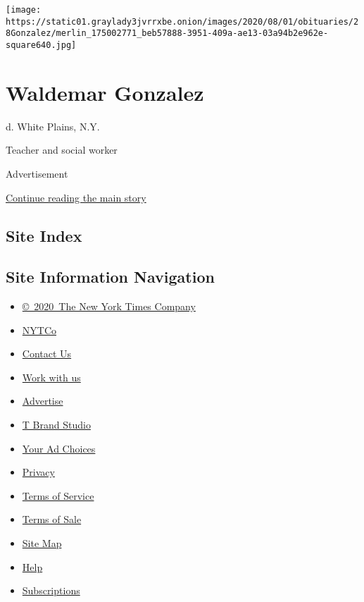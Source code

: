 \texttt{[image: https://static01.graylady3jvrrxbe.onion/images/2020/08/01/obituaries/28Gonzalez/merlin\_175002771\_beb57888-3951-409a-ae13-03a94b2e962e-square640.jpg]}

\hypertarget{waldemar-gonzalez}{%
\section{Waldemar Gonzalez}\label{waldemar-gonzalez}}

d. White Plains, N.Y.

Teacher and social worker

Advertisement

\protect\hyperlink{after-bottom}{Continue reading the main story}

\hypertarget{site-index}{%
\subsection{Site Index}\label{site-index}}

\hypertarget{site-information-navigation}{%
\subsection{Site Information
Navigation}\label{site-information-navigation}}

\begin{itemize}
\tightlist
\item
  \href{https://help.nytimes3xbfgragh.onion/hc/en-us/articles/115014792127-Copyright-notice}{©~2020~The
  New York Times Company}
\end{itemize}

\begin{itemize}
\tightlist
\item
  \href{https://www.nytco.com/}{NYTCo}
\item
  \href{https://help.nytimes3xbfgragh.onion/hc/en-us/articles/115015385887-Contact-Us}{Contact
  Us}
\item
  \href{https://www.nytco.com/careers/}{Work with us}
\item
  \href{https://nytmediakit.com/}{Advertise}
\item
  \href{http://www.tbrandstudio.com/}{T Brand Studio}
\item
  \href{https://www.nytimes3xbfgragh.onion/privacy/cookie-policy\#how-do-i-manage-trackers}{Your
  Ad Choices}
\item
  \href{https://www.nytimes3xbfgragh.onion/privacy}{Privacy}
\item
  \href{https://help.nytimes3xbfgragh.onion/hc/en-us/articles/115014893428-Terms-of-service}{Terms
  of Service}
\item
  \href{https://help.nytimes3xbfgragh.onion/hc/en-us/articles/115014893968-Terms-of-sale}{Terms
  of Sale}
\item
  \href{https://spiderbites.nytimes3xbfgragh.onion}{Site Map}
\item
  \href{https://help.nytimes3xbfgragh.onion/hc/en-us}{Help}
\item
  \href{https://www.nytimes3xbfgragh.onion/subscription?campaignId=37WXW}{Subscriptions}
\end{itemize}
